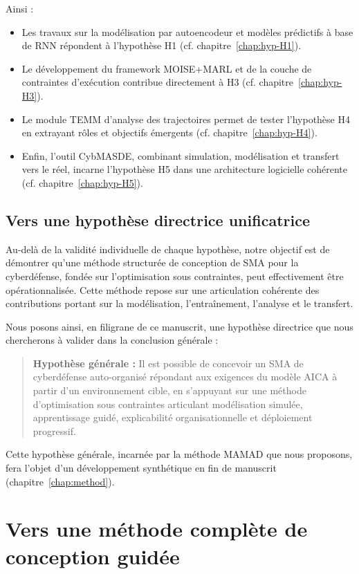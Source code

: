 \documentclass[ twoside,openright,titlepage,numbers=noenddot,headinclude,%
                footinclude=true,cleardoublepage=empty,abstractoff, %
                BCOR=5mm,paper=a4,fontsize=11pt,%
                french,american,%
                ]{scrreprt}
\begin{document}
Ainsi :
\begin{itemize}
    \item Les travaux sur la modélisation par autoencodeur et modèles prédictifs à base de RNN répondent à l'hypothèse H1 (cf. chapitre~\ref{chap:hyp-H1}).
    \item Le développement du framework MOISE+MARL et de la couche de contraintes d'exécution contribue directement à H3 (cf. chapitre~\ref{chap:hyp-H3}).
    \item Le module TEMM d'analyse des trajectoires permet de tester l'hypothèse H4 en extrayant rôles et objectifs émergents (cf. chapitre~\ref{chap:hyp-H4}).
    \item Enfin, l'outil CybMASDE, combinant simulation, modélisation et transfert vers le réel, incarne l'hypothèse H5 dans une architecture logicielle cohérente (cf. chapitre~\ref{chap:hyp-H5}).
\end{itemize}

\subsection{Vers une hypothèse directrice unificatrice}

Au-delà de la validité individuelle de chaque hypothèse, notre objectif est de démontrer qu'une méthode structurée de conception de SMA pour la cyberdéfense, fondée sur l'optimisation sous contraintes, peut effectivement être opérationnalisée. Cette méthode repose sur une articulation cohérente des contributions portant sur la modélisation, l'entraînement, l'analyse et le transfert.

Nous posons ainsi, en filigrane de ce manuscrit, une hypothèse directrice que nous chercherons à valider dans la conclusion générale :

\begin{quote}
    \textbf{Hypothèse générale :} Il est possible de concevoir un SMA de cyberdéfense auto-organisé répondant aux exigences du modèle AICA à partir d'un environnement cible, en s'appuyant sur une méthode d'optimisation sous contraintes articulant modélisation simulée, apprentissage guidé, explicabilité organisationnelle et déploiement progressif.
\end{quote}

Cette hypothèse générale, incarnée par la méthode MAMAD que nous proposons, fera l'objet d'un développement synthétique en fin de manuscrit (chapitre~\ref{chap:method}).


\section{Vers une méthode complète de conception guidée}\label{sec:method-response}
\end{document}
